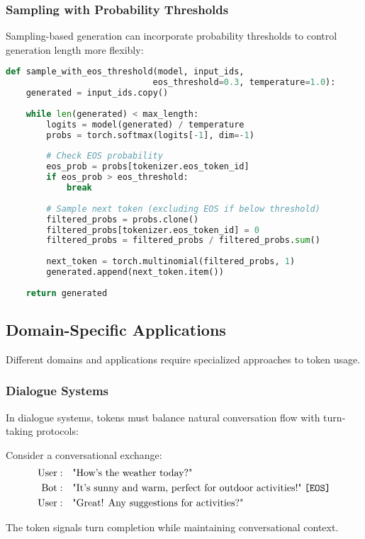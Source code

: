 \subsubsection{Sampling with \eos{} Probability Thresholds}

Sampling-based generation can incorporate \eos{} probability thresholds to control generation length more flexibly:

\begin{lstlisting}[language=Python, caption=Sampling with \eos{} probability control]
def sample_with_eos_threshold(model, input_ids, 
                             eos_threshold=0.3, temperature=1.0):
    generated = input_ids.copy()
    
    while len(generated) < max_length:
        logits = model(generated) / temperature
        probs = torch.softmax(logits[-1], dim=-1)
        
        # Check EOS probability
        eos_prob = probs[tokenizer.eos_token_id]
        if eos_prob > eos_threshold:
            break
        
        # Sample next token (excluding EOS if below threshold)
        filtered_probs = probs.clone()
        filtered_probs[tokenizer.eos_token_id] = 0
        filtered_probs = filtered_probs / filtered_probs.sum()
        
        next_token = torch.multinomial(filtered_probs, 1)
        generated.append(next_token.item())
    
    return generated
\end{lstlisting}

\subsection{Domain-Specific \eos{} Applications}

Different domains and applications require specialized approaches to \eos{} token usage.

\subsubsection{Dialogue Systems}

In dialogue systems, \eos{} tokens must balance natural conversation flow with turn-taking protocols:

\begin{example}
Consider a conversational exchange:
\begin{align}
\text{User}: &\quad \text{"How's the weather today?"} \\
\text{Bot}: &\quad \text{"It's sunny and warm, perfect for outdoor activities!"} \; \texttt{[EOS]}{} \\
\text{User}: &\quad \text{"Great! Any suggestions for activities?"}
\end{align}

The \eos{} token signals turn completion while maintaining conversational context.
\end{example}

